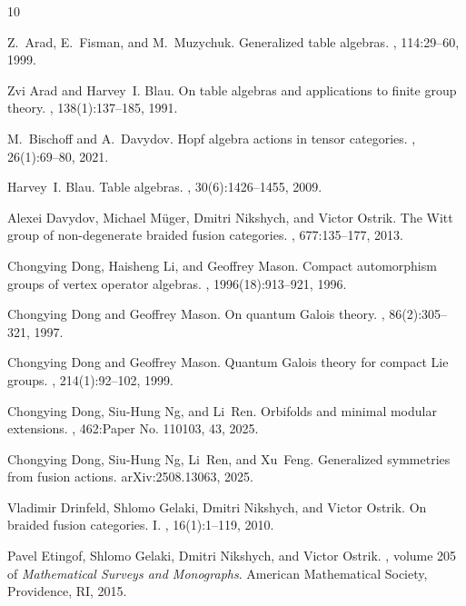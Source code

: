 \documentclass{amsart}
\begin{document}

%
\begin{thebibliography}{10}

Z.~Arad, E.~Fisman, and M.~Muzychuk.
\newblock Generalized table algebras.
, 114:29--60, 1999.

Zvi Arad and Harvey~I. Blau.
\newblock On table algebras and applications to finite group theory.
, 138(1):137--185, 1991.

M.~Bischoff and A.~Davydov.
\newblock Hopf algebra actions in tensor categories.
, 26(1):69--80, 2021.

Harvey~I. Blau.
\newblock Table algebras.
, 30(6):1426--1455, 2009.

Alexei Davydov, Michael M\"{u}ger, Dmitri Nikshych, and Victor Ostrik.
\newblock The {W}itt group of non-degenerate braided fusion categories.
, 677:135--177, 2013.

Chongying Dong, Haisheng Li, and Geoffrey Mason.
\newblock Compact automorphism groups of vertex operator algebras.
, 1996(18):913--921, 1996.

Chongying Dong and Geoffrey Mason.
\newblock On quantum {G}alois theory.
, 86(2):305--321, 1997.

Chongying Dong and Geoffrey Mason.
\newblock Quantum {G}alois theory for compact {L}ie groups.
, 214(1):92--102, 1999.

Chongying Dong, Siu-Hung Ng, and Li~Ren.
\newblock Orbifolds and minimal modular extensions.
, 462:Paper No. 110103, 43, 2025.

Chongying Dong, Siu-Hung Ng, Li~Ren, and Xu~Feng.
\newblock Generalized symmetries from fusion actions.
\newblock arXiv:2508.13063, 2025.

Vladimir Drinfeld, Shlomo Gelaki, Dmitri Nikshych, and Victor Ostrik.
\newblock On braided fusion categories. {I}.
, 16(1):1--119, 2010.

Pavel Etingof, Shlomo Gelaki, Dmitri Nikshych, and Victor Ostrik.
, volume 205 of {\em Mathematical Surveys and
  Monographs}.
\newblock American Mathematical Society, Providence, RI, 2015.


\end{thebibliography}
\end{document}

